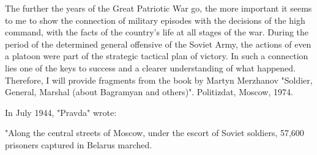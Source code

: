 
{
The further the years of the Great Patriotic War go, the more important it seems to me to show the connection of military episodes with the decisions of the high command, with the facts of the country's life at all stages of the war. During the period of the determined general offensive of the Soviet Army, the actions of even a platoon were part of the strategic tactical plan of victory. In such a connection lies one of the keys to success and a clearer understanding of what happened. Therefore, I will provide fragments from the book by Martyn Merzhanov "Soldier, General, Marshal (about Bagramyan and others)". Politizdat, Moscow, 1974.}


{In July 1944, "Pravda" wrote:}

{
"Along the central streets of Moscow, under the escort of Soviet soldiers, 57,600 prisoners captured in Belarus marched.}

